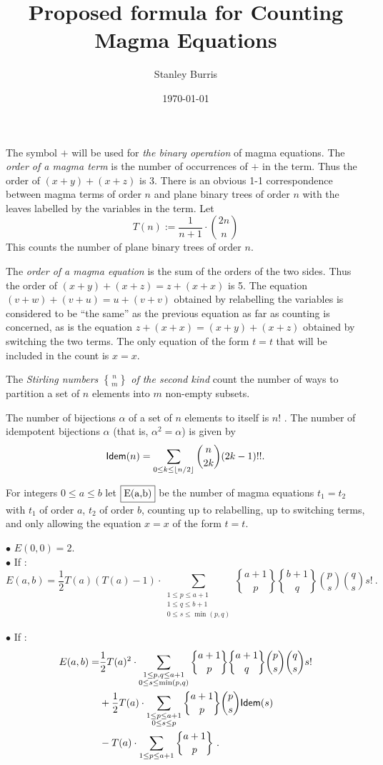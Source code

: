 \documentclass[12pt]{amsart}
\title{Proposed formula for Counting Magma Equations}
\author{Stanley Burris}
\date{\today}
\newcommand{\Idem}{{\sf Idem}}
\begin{document}
\maketitle

The symbol $+$ will be used for {\it the binary operation} of magma equations. The {\it order of a magma term} is the number of occurrences of $+$ in the term. Thus the order of $(x+y) + (x + z)$ is 3. There is an obvious 1-1 correspondence between magma terms of order $n$ and plane binary trees of order $n$ with the leaves labelled by the variables in the term. Let
$$
T(n) := \frac{1}{n+1} \cdot {2n \choose n}
$$
This counts the number of plane binary trees of order $n$.

The {\it order of a magma equation} is the sum of the orders of the two sides. Thus the order of $(x+y) +(x+z) = z + (x +x)$ is 5. 
The equation $(v+w) +(v+u) = u + (v +v)$ obtained by relabelling the variables is considered to be ``the same'' as the previous equation as far as counting is concerned, as is the equation 
$ z + (x +x) = (x+y) +(x+z) $
obtained by switching the two terms. The only equation of the form $t = t$ that will be included in the count is $x=x$.

The {\it Stirling numbers $n \brace m$ of the second kind} count the number of ways to partition a set of $n$ elements into $m$ non-empty subsets.

The number of bijections $\alpha$ of a set of $n$ elements to itself is $n!$ .
The number of idempotent bijections $\alpha$ (that is, $\alpha^2 = \alpha$) is given by
$$
\Idem(n) = \sum_{0 \leq k \leq \lfloor n/2 \rfloor}  {n\choose 2k} (2k-1)!!.
$$

For integers $0 \le a \le b$ let $\fbox{E(a,b)}$ be the number of magma equations $t_1 = t_2$ with $t_1$ of order $a$, $t_2$ of order $b$, counting up to relabelling, up to switching terms, and only allowing the equation $x=x$ of the form $t=t$. 

\pagebreak

$\bullet$ $E(0,0) = 2$.\\

$\bullet$ If : 
$$
E(a,b) = \frac{1}{2} T(a)(T(a) - 1)\cdot \sum_{\substack{1 \le p \le a+1\\ 1 \le q \le b+1\\0\le s \le \min(p,q)}} 
{a+1 \brace p} {b+1 \brace q} {p \choose s} {q \choose s} s! \ .
$$

$\bullet$ If : 
\begin{align*}
E(a,b) = &\frac{1}{2} T(a)^2\cdot \sum_{\substack{1 \le p,q \le a+1\\ 0\le s \le \min(p,q)}} 
{a+1 \brace p} {a+1 \brace q} {p \choose s} {q \choose s} s! \\
&+ \frac{1}{2} T(a) \cdot \sum_{\substack{1 \le p \le a+1\\ 0\le s \le p}} 
{a+1 \brace p}  {p \choose s}  \Idem(s)\\
&- T(a)\cdot \sum_{1\le p \le a+1}  {a+1 \brace p} \ .
\end{align*}
\end{document}
